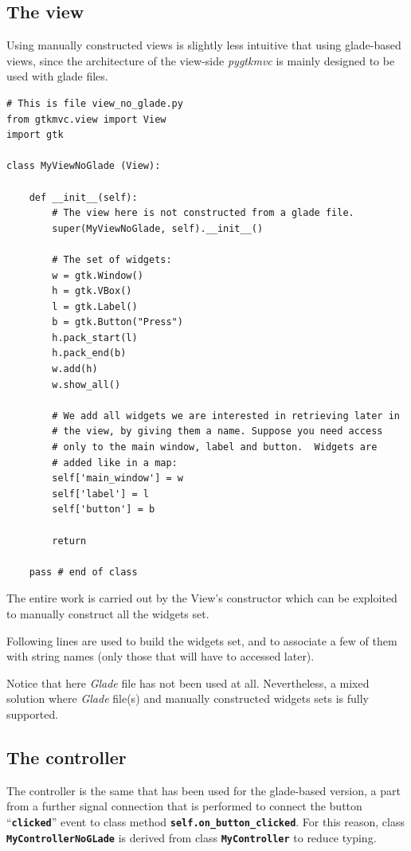 \documentclass{article}
\newcommand{\kw}[1]{\emph{#1}\xspace}
\newcommand{\appl}[1]{\textsl{#1}\xspace}
\newcommand{\glade}{\appl{Glade}}
\newcommand{\pygtkmvc}{\kw{pygtkmvc}}
\newcommand{\codename}[1]{\texttt{\bfseries \textcolor {codecolor}{#1}}\xspace}
\newcommand{\codesize}{\small } %
\begin{document}
\subsection{The view}
Using manually constructed views is slightly less intuitive that using
glade-based views, since the architecture of the view-side \pygtkmvc
is mainly designed to be used with glade files.

{ \codesize 
\begin{verbatim}   
# This is file view_no_glade.py
from gtkmvc.view import View
import gtk

class MyViewNoGlade (View):

    def __init__(self):
        # The view here is not constructed from a glade file.
        super(MyViewNoGlade, self).__init__()

        # The set of widgets:
        w = gtk.Window()
        h = gtk.VBox()
        l = gtk.Label()
        b = gtk.Button("Press")
        h.pack_start(l)
        h.pack_end(b)
        w.add(h)
        w.show_all()

        # We add all widgets we are interested in retrieving later in
        # the view, by giving them a name. Suppose you need access
        # only to the main window, label and button.  Widgets are
        # added like in a map:
        self['main_window'] = w
        self['label'] = l
        self['button'] = b
        
        return

    pass # end of class
\end{verbatim}
} 

The entire work is carried out by the View's constructor which can
be exploited to manually construct all the widgets set.

Following lines are used to build the widgets set, and to associate a
few of them with string names (only those that will have to accessed
later).

Notice that here \glade file has not been used at all. Nevertheless, a
mixed solution where \glade file(s) and manually constructed widgets
sets is fully supported.


\subsection{The controller}
The controller is the same that has been used for the glade-based
version, a part from a further signal connection that is performed to
connect the button ``\codename{clicked}'' event to class method
\codename{self.on\_button\_clicked}. For this reason, class
\codename{MyControllerNoGLade} is derived from class
\codename{MyController} to reduce typing.
 
\end{document}

